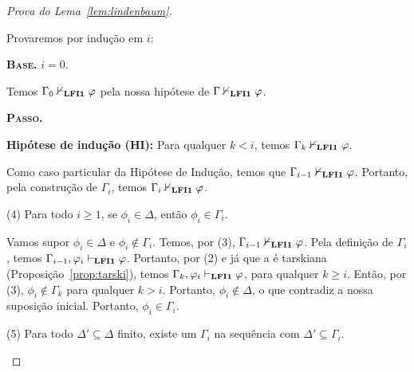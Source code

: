 \begin{proof}[Prova do Lema~\ref{lem:lindenbaum}]
\begin{adjustwidth}{1cm}{}
                Provaremos por indução em $i$:

                \begin{adjustwidth}{1cm}{}
                    \noindent\textbf{\textsc{Base.}} $i = 0$.
                    
                    \begin{adjustwidth}{1cm}{}
                        
                        Temos $\Gamma_0 \nvdash_{{\normalfont\textbf{LFI1}}{}} \varphi$ pela nossa hipótese de $\Gamma \nvdash_{{\normalfont\textbf{LFI1}}{}} \varphi$.
                        
                    \end{adjustwidth}
                    
                    \noindent\textbf{\textsc{Passo.}} 
                    
                    \noindent\textbf{Hipótese de indução (HI):} Para qualquer $k < i$, temos $\Gamma_k \nvdash_{{\normalfont\textbf{LFI1}}{}} \varphi$.
                    
                        Como caso particular da Hipótese de Indução, temos que $\Gamma_{i-1} \nvdash_{{\normalfont\textbf{LFI1}}{}} \varphi$. Portanto, pela construção de $\Gamma_i$, temos $\Gamma_i \nvdash_{{\normalfont\textbf{LFI1}}{}} \varphi$.
                        
                \end{adjustwidth}

                
                \noindent(4) Para todo $i \geq 1$, se $\phi_i \in \Delta$, então $\phi_i \in \Gamma_i$.

                \begin{adjustwidth}{1cm}{}


                    Vamos supor $\phi_i \in \Delta$ e $\phi_i \not \in \Gamma_i$. Temos, por (3), $\Gamma_{i - 1} \nvdash_{{\normalfont\textbf{LFI1}}{}} \varphi$. Pela definição de $\Gamma_i$, temos $\Gamma_{i - 1}, \varphi_i \vdash_{{\normalfont\textbf{LFI1}}{}} \varphi$. Portanto, por (2) e já que a \lfium{} é tarskiana (Proposição~\ref{prop:tarski}), temos $\Gamma_k, \varphi_i \vdash_{{\normalfont\textbf{LFI1}}{}} \varphi$, para qualquer $k \geq i$. Então, por (3), $\phi_i \not \in \Gamma_k$ para qualquer $k > i$. Portanto, $\phi_i \not \in \Delta$, o que contradiz a nossa suposição inicial. Portanto, $\phi_i \in \Gamma_i$.

                \end{adjustwidth}

                \noindent(5) Para todo $\Delta' \subseteq \Delta$ finito, existe um $\Gamma_i$ na sequência com $\Delta' \subseteq \Gamma_i$.

                \begin{adjustwidth}{1cm}{}


\end{adjustwidth}
\end{adjustwidth}
\end{proof}
